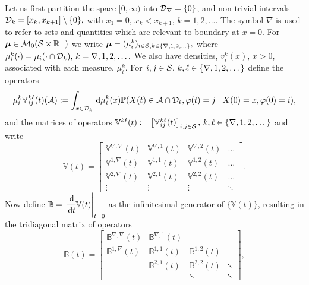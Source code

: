 Let us first partition the space \([0,\infty)\) into \(\mathcal{D}_\nabla = \{0\}\), and non-trivial intervals \(\mathcal{D}_k=[x_k,x_{k+1}]\setminus \{0\},\) with \(x_1=0,\, x_k<x_{k+1},\,k=1,2,...\). The symbol \(\nabla\) is used to refer to sets and quantities which are relevant to boundary at \(x=0\). For $\boldsymbol{\mu} \in \mathcal{M}_0(\mathcal{S} \times \mathbb{R}_{+})$ we write \(\boldsymbol{\mu} = (\mu^{k}_i)_{i \in \mathcal{S},k\in\{\nabla,1,2,...\}},\) where $\mu^{k}_i(\cdot) = \mu_i(\cdot \cap \mathcal{D}_k),\,k=\nabla,1,2,\dots.$ We also have densities, \(v_i^k(x),\,x>0\), associated with each measure, \(\mu_i^k\). For \( i,j\in\mathcal{S},\,k,\ell\in\{\nabla,1,2,\dots\}\) define the operators 
\[\mu_i^k \mathbb V_{ij}^{k \ell}(t)(\mathcal A) := \int_{x\in\mathcal{D}_k} \, \mathrm{d} \mu_i^k(x)\mathbb P (X(t) \in\mathcal A\cap \mathcal{D}_\ell,\varphi(t) = j \mid X(0) = x, \varphi(0) = i),\]
and the matrices of operators \(\mathbb V^{k\ell}(t) := \begin{bmatrix} \mathbb V_{ij}^{k\ell}(t) \end{bmatrix}_{i,j\in\mathcal S},\,k,\ell\in\{\nabla,1,2,\dots\}\) and write 
\[\mathbb V(t) = \left[
	\begin{array}{llll}
		\mathbb V^{\nabla,\nabla}(t)&\mathbb V^{\nabla,1}(t)& \mathbb V^{\nabla,2}(t) &\hdots \\
		\mathbb V^{1,\nabla}(t)&\mathbb V^{1,1}(t)&\mathbb V^{1,2}(t)&\hdots\\
		\mathbb V^{2,\nabla}(t)&\mathbb V^{2,1}(t)&\mathbb V^{2,2}(t)&\hdots\\
		\vdots & \vdots & \vdots & \ddots 
	\end{array}\right].\]
Now define \(\mathbb B=\left.\cfrac{\, \mathrm{d}}{\, \mathrm{d} t}\mathbb V(t)\right|_{t=0}\) as the infinitesimal generator of \(\{\mathbb V(t)\}\), resulting in the tridiagonal matrix of operators 
\[\mathbb B(t) = \left[
	\begin{array}{llll}
		\mathbb B^{\nabla,\nabla}(t)&\mathbb B^{\nabla,1}(t)& & \\
		\mathbb B^{1,\nabla}(t)&\mathbb B^{1,1}(t)&\mathbb B^{1,2}(t)&\\
		&\mathbb B^{2,1}(t)&\mathbb B^{2,2}(t)&\ddots\\
		& & \ddots & \ddots 
	\end{array}\right],\]
